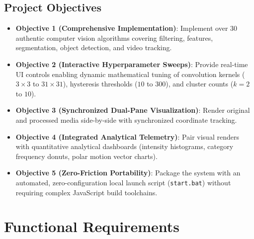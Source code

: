 \documentclass[12pt,a4paper]{article}
\begin{document}
\subsection{Project Objectives}
\begin{itemize}
    \item \textbf{Objective 1 (Comprehensive Implementation)}: Implement over 30 authentic computer vision algorithms covering filtering, features, segmentation, object detection, and video tracking.
    \item \textbf{Objective 2 (Interactive Hyperparameter Sweeps)}: Provide real-time UI controls enabling dynamic mathematical tuning of convolution kernels ($3 \times 3$ to $31 \times 31$), hysteresis thresholds ($10$ to $300$), and cluster counts ($k = 2$ to $10$).
    \item \textbf{Objective 3 (Synchronized Dual-Pane Visualization)}: Render original and processed media side-by-side with synchronized coordinate tracking.
    \item \textbf{Objective 4 (Integrated Analytical Telemetry)}: Pair visual renders with quantitative analytical dashboards (intensity histograms, category frequency donuts, polar motion vector charts).
    \item \textbf{Objective 5 (Zero-Friction Portability)}: Package the system with an automated, zero-configuration local launch script (\texttt{start.bat}) without requiring complex JavaScript build toolchains.
\end{itemize}

\section{Functional Requirements}
\end{document}
